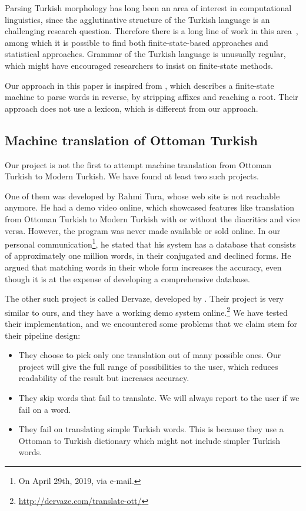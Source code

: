 \documentclass[10pt,twocolumn]{article}
\theoremstyle{nonumberplain}
\begin{document}
Parsing Turkish morphology has long been an area of interest in computational
linguistics, since the agglutinative structure of the Turkish language
is an challenging research question. Therefore there is a long line of work in this area~\cite{hankamer1986finite, solak1992parsing, oflazer1994two, oflazer1994outline, hakkani2002statistical, eryigit2004affix, sak2007morphological, sak2009stochastic, coltekin2010freely}, among which it is possible to find both finite-state-based approaches and statistical approaches.
Grammar of the Turkish language is unusually regular, which might have
encouraged researchers to insist on finite-state methods.

Our approach in this paper is inspired from \citet{eryigit2004affix}, which
describes a finite-state machine to parse words in reverse, by stripping
affixes and reaching a root. Their approach does not use a lexicon, which is
different from our approach.

\subsection{Machine translation of Ottoman Turkish}

Our project is not the first to attempt machine translation from Ottoman
Turkish to Modern Turkish. We have found at least two such projects.

One of them was developed by Rahmi Tura, whose web site is not
reachable anymore. He had a demo video online, which showcased features like
translation from Ottoman Turkish to Modern Turkish with or without the
diacritics and vice versa. However, the program was never made available or
sold online. In our personal communication\footnote{On April 29th, 2019, via e-mail.}, he stated that
his system has a database that consists of approximately one million words, in
their conjugated and declined forms. He argued that matching words in their
whole form increases the accuracy, even though it is at the expense of
developing a comprehensive database.

The other such project is called Dervaze, developed by \citet{dervaze}.
Their project is very similar to ours, and they have a working demo system
online.\footnote{\url{http://dervaze.com/translate-ott/}}
We have tested their implementation, and we encountered some problems that we claim stem for their pipeline design:
\begin{itemize}[noitemsep,topsep=0pt]
\item They choose to pick only one translation out of many possible ones. Our project will give the full range of possibilities to the user, which reduces readability of the result but increases accuracy.
\item They skip words that fail to translate. We will always report to the user if we fail on a word.
\item They fail on translating simple Turkish words. This is because they use a Ottoman to Turkish dictionary which might not include simpler Turkish words.
\end{itemize}
\end{document}

